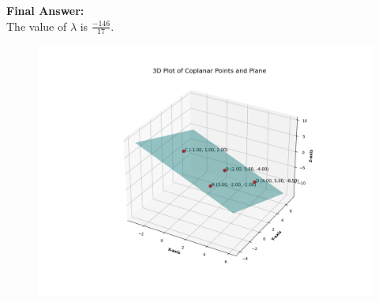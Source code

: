 \documentclass[journal,12pt,onecolumn]{IEEEtran}
\theoremstyle{remark}
\begin{document}
\textbf{Final Answer:}\\
The value of $\lambda$ is $\frac{-146}{17}$.

\begin{figure}[H]
    \centering
    \includegraphics[width=1.05\columnwidth]{figs/2.png}
\end{figure}
\end{document}
